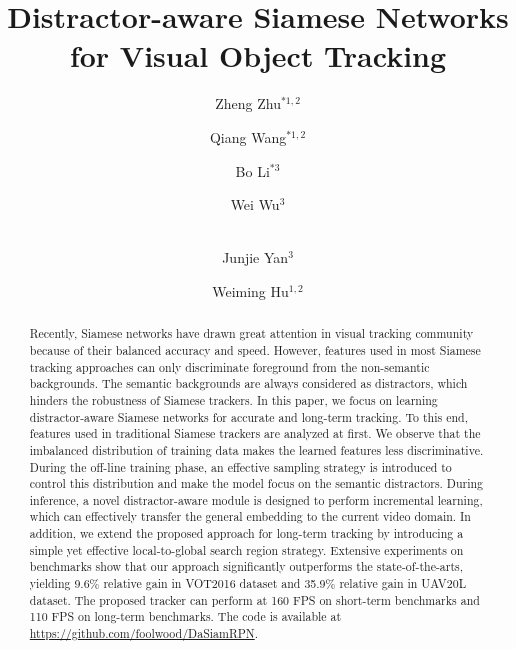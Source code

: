 \documentclass[runningheads]{llncs}
\begin{document}
\title{Distractor-aware Siamese Networks for Visual Object Tracking}




\author{Zheng Zhu$^{* 1,2}$ \and Qiang Wang$^{* 1,2}$ \and Bo Li$^{* 3}$ \and Wei Wu$^{3}$ \and \\
Junjie Yan$^{3}$ \and Weiming Hu$^{1,2}$}
\maketitle              \begin{abstract}

Recently, Siamese networks have drawn great attention in visual tracking community because of their balanced accuracy and speed.
However, features used in most Siamese tracking approaches can only discriminate foreground from the non-semantic backgrounds.
The semantic backgrounds are always considered as distractors, which hinders the robustness of Siamese trackers.
In this paper, we focus on learning distractor-aware Siamese networks for accurate and long-term tracking.
To this end, features used in traditional Siamese trackers are analyzed at first.
We observe that the imbalanced distribution of training data makes the learned features less discriminative.
During the off-line training phase, an effective sampling strategy is introduced to control this distribution and make the model focus on the semantic distractors.
During inference, a novel distractor-aware module is designed to perform incremental learning, which can effectively transfer the general embedding to the current video domain.
In addition, we extend the proposed approach for long-term tracking by introducing a simple yet effective local-to-global search region strategy.
Extensive experiments on benchmarks show that our approach significantly outperforms the state-of-the-arts, yielding 9.6\% relative gain in VOT2016 dataset and 35.9\% relative gain in UAV20L dataset.
The proposed tracker can perform at 160 FPS on short-term benchmarks and 110 FPS on long-term benchmarks. The code is available at \url{https://github.com/foolwood/DaSiamRPN}.
\end{abstract}
\end{document}
